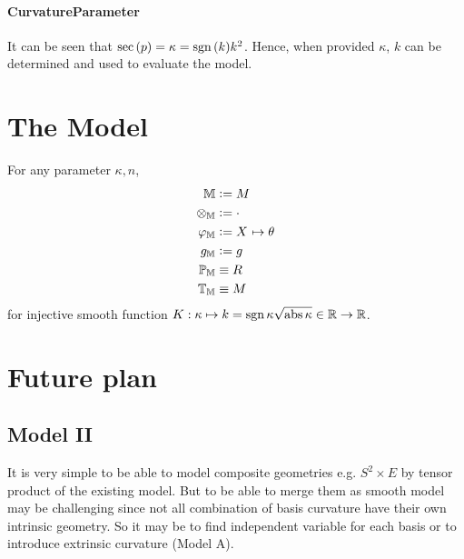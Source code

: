 \documentclass[stu, babel, american, biblatex, a4paper, draftall]{apa7}
\begin{document}
\paragraph{CurvatureParameter}
It can be seen that $\operatorname{sec}\left(p\right) = \kappa = \operatorname{sgn}{\left(k\right)}k^2$.
Hence, when provided $\kappa$, $k$ can be determined and used to evaluate the model.
\section{The Model}
\begin{ModelGroupElement}
    For any parameter $\kappa, n$,
    \begin{align*}
        \elements                   & \defeq M                                    \\
        \groupoperation{\elements}  & \defeq \cdot                                \\
        \charts{\elements}          & \defeq \tensor{X}{}\mapsto\tensor{\theta}{} \\
        \innerprod{\elements}       & \defeq g                                    \\
        \points{\elements}          & \equiv R                                    \\
        \transformations{\elements} & \equiv M                                    \\
    \end{align*}
    for injective smooth function $K:\kappa \mapsto k = \operatorname{sgn}{\kappa}\sqrt{\operatorname{abs}{\kappa}}\in\mathbb{R}\to\mathbb{R}$.
\end{ModelGroupElement}
\begin{ModelGroupAssertion}
\end{ModelGroupAssertion}
\begin{ModelCurvatureAssertion}
\end{ModelCurvatureAssertion}
\section{Future plan}
\subsection{Model II}
It is very simple to be able to model composite geometries e.g. $S^2 \times E$ by tensor product of the existing model. But to be able to merge them as smooth model may be challenging since not all combination of basis curvature have their own intrinsic geometry. So it may be to find independent variable for each basis or to introduce extrinsic curvature (Model A).
\end{document}
